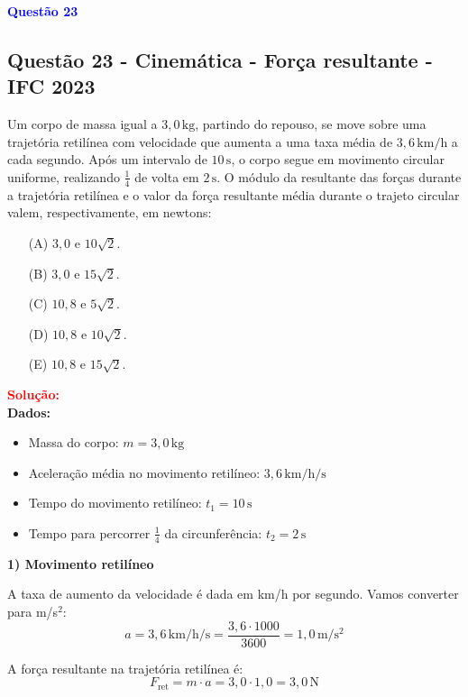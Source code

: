 \documentclass[a4paper,12pt]{article}
\begin{document}
\begin{flushleft}
\textbf{\textcolor{blue}{\Large Quest\~ao 23}}\\
\noindent
\subsection{Quest\~ao 23 - Cinemática - For\c{c}a resultante - IFC 2023}
Um corpo de massa igual a $3{,}0\,\mathrm{kg}$, partindo do repouso, 
se move sobre uma trajetória retilínea com velocidade que aumenta a 
uma taxa média de $3{,}6\,\mathrm{km/h}$ a cada segundo. Após um intervalo 
de $10\,\mathrm{s}$, o corpo segue em movimento circular uniforme, realizando 
$\frac{1}{4}$ de volta em $2\,\mathrm{s}$. O módulo da resultante das forças 
durante a trajetória retilínea e o valor da força resultante média durante o 
trajeto circular valem, respectivamente, em newtons:

\begin{itemize}
\item[(A)] $3{,}0$ e $10\sqrt{2}$.
\item[(B)] $3{,}0$ e $15\sqrt{2}$.
\item[(C)] $10{,}8$ e $5\sqrt{2}$.
\item[(D)] $10{,}8$ e $10\sqrt{2}$.
\item[(E)] $10{,}8$ e $15\sqrt{2}$.
\end{itemize}

\vspace{0.5cm}

\textcolor{red}{\textbf{Solução:}}\\

\textbf{Dados:}
\begin{itemize}
    \item Massa do corpo: $m = 3,0\,\mathrm{kg}$
    \item Aceleração média no movimento retilíneo: $3,6\,\mathrm{km/h/s}$
    \item Tempo do movimento retilíneo: $t_1 = 10\,\mathrm{s}$
    \item Tempo para percorrer $\frac{1}{4}$ da circunferência: $t_2 = 2\,\mathrm{s}$
\end{itemize}

\textbf{1) Movimento retilíneo}

A taxa de aumento da velocidade é dada em km/h por segundo. Vamos converter para m/s$^2$:
\[
a = 3{,}6\,\mathrm{km/h/s} = \frac{3{,}6 \cdot 1000}{3600} = 1{,}0\,\mathrm{m/s^2}
\]

A força resultante na trajetória retilínea é:
\[
F_{\text{ret}} = m \cdot a = 3{,}0 \cdot 1{,}0 = 3{,}0\,\mathrm{N}
\]


\end{flushleft}
\end{document}

